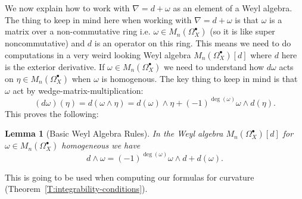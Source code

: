 \documentclass[12pt]{book}
\numberwithin{equation}{section}
\newtheorem{lemma}[theorem]{Lemma}
\theoremstyle{definition}
\theoremstyle{remark}
\begin{document}
We now explain how to work with $\nabla=d+\omega$ as an element of a Weyl algebra.
The thing to keep in mind here when working with $\nabla =d+\omega$ is that $\omega$ is a matrix over a non-commutative ring i.e. $\omega \in M_n(\Omega_X^{\bullet})$ (so it is like super noncommutative) and $d$ is an operator on this ring. 
This means we need to do computations in a very weird looking Weyl algebra $M_n(\Omega_X^{\bullet})[d]$ where $d$ here is the exterior derivative. 
If $\omega \in M_n(\Omega_X^{\bullet})$ we need to understand how $d\omega$ acts on $\eta\in M_n(\Omega_X^{\bullet})$ when $\omega$ is homogenous. 
The key thing to keep in mind is that  $\omega$ act by wedge-matrix-multiplication:
$$(d\omega)(\eta) = d(\omega\wedge \eta) = d(\omega) \wedge \eta + (-1)^{\deg(\omega)} \omega \wedge d(\eta).$$
This proves the following:
\begin{lemma}[Basic Weyl Algebra Rules]\label{L:exterior-weyl-algebra}
In the Weyl algebra	$M_n(\Omega_X^{\bullet})[d]$ for $\omega \in M_n(\Omega_X^{\bullet})$ homogeneous we have 
	\begin{equation}
	d \wedge \omega = (-1)^{\deg(\omega)} \omega \wedge d + d(\omega).
	\end{equation}
\end{lemma}
This is going to be used when computing our formulas for curvature (Theorem~\ref{T:integrability-conditions}).
\end{document}
